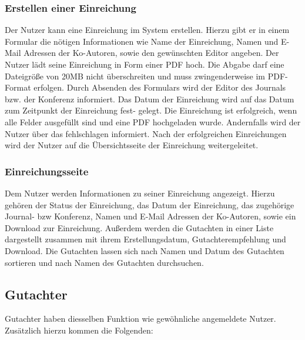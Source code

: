 \subsubsection{Erstellen einer Einreichung}
\begin{description}
    \XXitem{} Der Nutzer kann eine Einreichung im System erstellen. Hierzu gibt er in einem
    Formular die nötigen Informationen wie Name der Einreichung, Namen und E-Mail Adressen der Ko-Autoren,
    sowie den gewünschten Editor angeben.
    \XXitem{} Der Nutzer lädt seine Einreichung in Form einer PDF hoch. Die Abgabe darf eine Dateigröße
    von 20MB nicht überschreiten und muss zwingenderweise im PDF-Format erfolgen.
    \XXitem{} Durch Absenden des Formulars wird der Editor des Journals bzw. der Konferenz
    informiert. Das Datum der Einreichung wird auf das Datum zum Zeitpunkt der Einreichung fest-
    gelegt.
    \XXitem{} Die Einreichung ist erfolgreich, wenn alle Felder ausgefüllt sind und eine PDF
    hochgeladen wurde. Andernfalls wird der Nutzer über das fehlschlagen informiert.
    \XXitem{} Nach der erfolgreichen Einreichungen wird der Nutzer auf die Übersichtsseite der
    Einreichung weitergeleitet.
\end{description}

\subsubsection{Einreichungsseite}
\begin{description}
     Dem Nutzer werden Informationen zu seiner Einreichung angezeigt.
    Hierzu gehören der Status der Einreichung, das Datum der Einreichung, das zugehörige
    Journal- bzw Konferenz, Namen und E-Mail Adressen der Ko-Autoren, sowie ein Download zur Einreichung.
    \XXitem{} Außerdem werden die Gutachten in einer
    Liste dargestellt zusammen mit ihrem Erstellungsdatum, Gutachterempfehlung und Download. %
    \XXitem{} Die Gutachten lassen sich nach Namen und Datum
    des Gutachten sortieren und nach Namen des Gutachten durchsuchen. %
\end{description}

\subsection{Gutachter}
Gutachter haben diesselben Funktion wie gewöhnliche angemeldete Nutzer. Zusätzlich hierzu kommen
die Folgenden:

